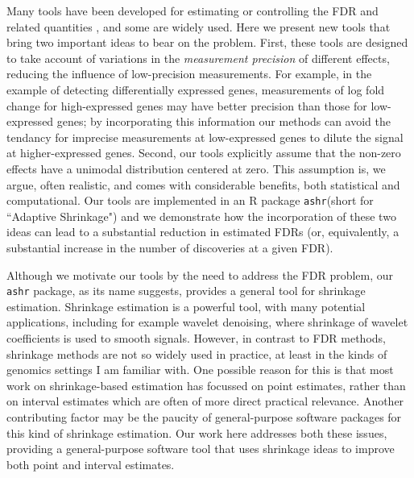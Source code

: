 \documentclass[11pt]{article}
\def\ashr{{\tt ashr}\xspace}
\begin{document}
%

Many tools have been developed for estimating or controlling the FDR and related quantities \cite{}, and some are widely used.
Here we present new tools that bring two important ideas to bear on the problem.
First, these tools are designed to take account of variations in the {\it measurement precision} of different effects, reducing the influence of low-precision measurements.
For example, in the example of detecting differentially expressed genes, measurements of log fold change for high-expressed genes 
may have better precision than those for low-expressed genes; by incorporating this information our methods can avoid the tendancy for 
imprecise measurements at low-expressed genes to dilute the signal at higher-expressed genes.
Second, our tools explicitly assume that the non-zero effects have a unimodal distribution centered at zero. This assumption 
is, we argue, often realistic, and comes with considerable benefits, both statistical and computational. 
Our tools are implemented in an R package \ashr (short for ``Adaptive Shrinkage") and we 
demonstrate how the incorporation of these two ideas can lead to a substantial reduction in estimated FDRs (or, equivalently,
a substantial increase in the number of discoveries at a given FDR).  

Although we motivate our tools by the need to address the FDR problem, our \ashr package, as its name suggests, 
provides a general tool for shrinkage estimation. Shrinkage estimation is a powerful tool, with many potential applications, including for example wavelet denoising, 
where shrinkage of wavelet coefficients is used to smooth signals. 
However, in contrast to FDR methods, shrinkage methods are not so widely used in practice, at least in the kinds
of genomics settings I am familiar with. One possible reason for this is that most work on shrinkage-based estimation has focussed
on point estimates, rather than on interval estimates which are often of more direct practical relevance. Another contributing
factor may be the paucity of general-purpose software packages for this kind of shrinkage estimation.
Our work here addresses both these issues, providing a general-purpose software tool that uses shrinkage ideas to improve both
point and interval estimates.
\end{document}

